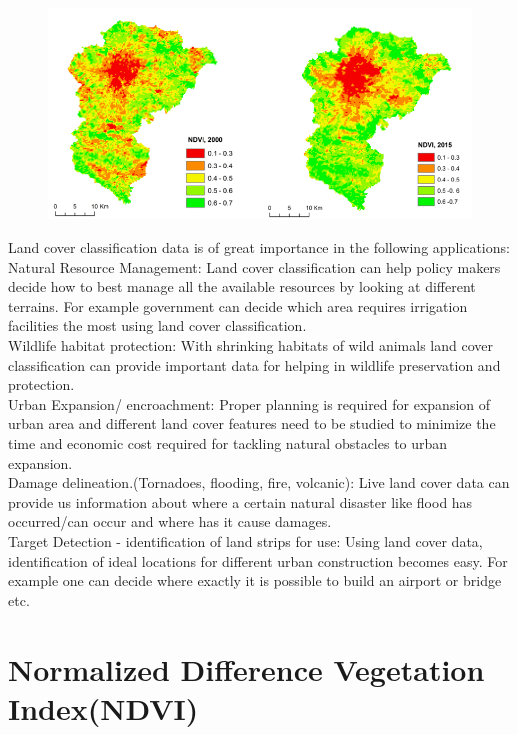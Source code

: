 \documentclass[12pt, a4paper]{report}
\begin{document}
\begin{figure}[h]
\centering
\includegraphics[width=\textwidth]{landcover.png}
\end{figure}
Land cover classification data is of great importance in the following applications:\\
Natural Resource Management: Land cover classification can help policy makers decide how to best manage all the available resources by looking at different terrains. For example government can decide which area requires irrigation facilities the most using land cover classification.  \\
Wildlife habitat protection: With shrinking habitats of wild animals land cover classification can provide important data for helping in wildlife preservation and protection.\\
 Urban Expansion/ encroachment: Proper planning is required for expansion of urban area and different land cover features need to be studied to minimize the time and economic cost required for tackling natural obstacles to urban expansion.\\
 Damage delineation.(Tornadoes, flooding, fire, volcanic): Live land cover data can provide us information about where a certain natural disaster like flood has occurred/can occur and where has it cause damages.\\
 Target Detection - identification of land strips for use: Using land cover data, identification of ideal locations for different urban construction becomes easy. For example one can decide where exactly it is possible to build an airport or bridge etc.\\


\section{Normalized Difference Vegetation Index(NDVI)}
\end{document}
